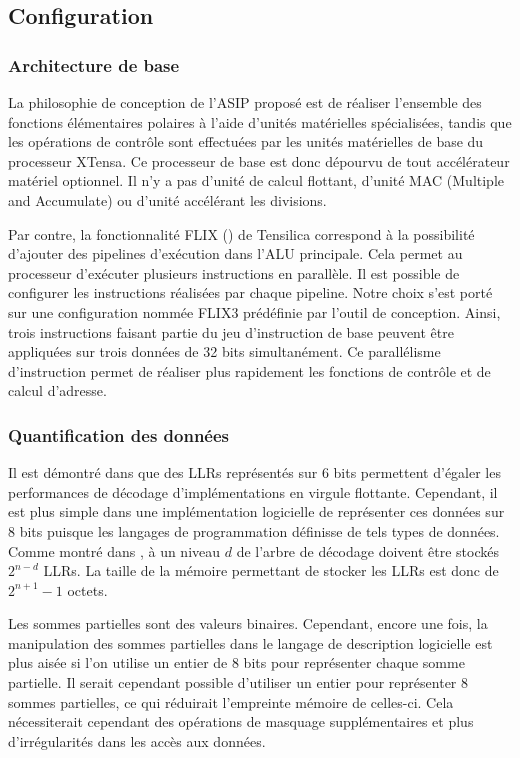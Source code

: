 \subsection{Configuration}
\subsubsection{Architecture de base}
La philosophie de conception de l'ASIP proposé est de réaliser l'ensemble des fonctions élémentaires polaires à l'aide d'unités matérielles spécialisées, tandis que les opérations de contrôle sont effectuées par les unités matérielles de base du processeur XTensa. Ce processeur de base est donc dépourvu de tout accélérateur matériel optionnel. Il n'y a pas d'unité de calcul flottant, d'unité MAC (Multiple and Accumulate) ou d'unité accélérant les divisions.

Par contre, la fonctionnalité FLIX () de Tensilica correspond à la possibilité d'ajouter des pipelines d'exécution dans l'ALU principale. Cela permet au processeur d'exécuter plusieurs instructions en parallèle. Il est possible de configurer les instructions réalisées par chaque pipeline. Notre choix s'est porté sur une configuration nommée FLIX3 prédéfinie par l'outil de conception. Ainsi, trois instructions faisant partie du jeu d'instruction de base peuvent être appliquées sur trois données de 32 bits simultanément. Ce parallélisme d'instruction permet de réaliser plus rapidement les fonctions de contrôle et de calcul d'adresse. 

\subsubsection{Quantification des données}
Il est démontré dans \cite{sarkis_fast_2014} que des LLRs représentés sur 6 bits permettent d'égaler les performances de décodage d'implémentations en virgule flottante. Cependant, il est plus simple dans une implémentation logicielle de représenter ces données sur 8 bits puisque les langages de programmation définisse de tels types de données. Comme montré dans \cite{leroux_hardware_2011}, à un niveau $d$ de l'arbre de décodage doivent être stockés $2^{n-d}$ LLRs. La taille de la mémoire permettant de stocker les LLRs est donc de $2^{n+1}-1$ octets.

Les sommes partielles sont des valeurs binaires. Cependant, encore une fois, la manipulation des sommes partielles dans le langage de description logicielle est plus aisée si l'on utilise un entier de 8 bits pour représenter chaque somme partielle. Il serait cependant possible d'utiliser un entier pour représenter 8 sommes partielles, ce qui réduirait l'empreinte mémoire de celles-ci. Cela nécessiterait cependant des opérations de masquage supplémentaires et plus d'irrégularités dans les accès aux données.

